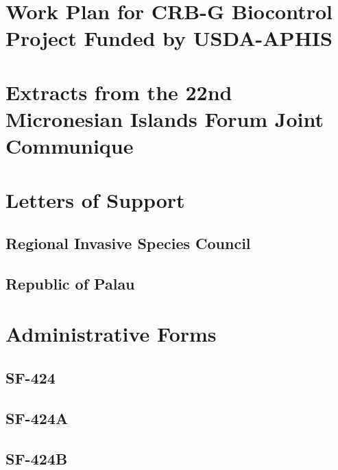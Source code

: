 \documentclass[12pt,letterpaper,english,bibliography=totocnumbered, abstract=on]{scrartcl}
\begin{document}
\section{\label{sec:Work-Plan-for}Work Plan for CRB-G Biocontrol Project
Funded by USDA-APHIS}



\section{\label{sec:Extracts-from-the}Extracts from the 22nd Micronesian
Islands Forum Joint Communique}



\section{Letters of Support}

\subsection{Regional Invasive Species Council}



\subsection{Republic of Palau}

\section{Administrative Forms}

\subsection{SF-424}



\subsection{SF-424A}



\subsection{SF-424B}


\end{document}
